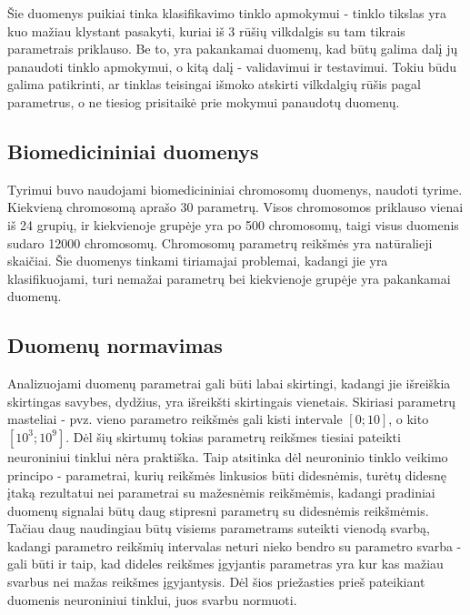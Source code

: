 \documentclass{VUMIFPSbakalaurinis}
\begin{document}
Šie duomenys puikiai tinka klasifikavimo tinklo apmokymui - tinklo tikslas yra kuo mažiau klystant pasakyti, kuriai iš 3 rūšių vilkdalgis su tam tikrais parametrais priklauso.
Be to, yra pakankamai duomenų, kad būtų galima dalį jų panaudoti tinklo apmokymui, o kitą dalį - validavimui ir testavimui.
Tokiu būdu galima patikrinti, ar tinklas teisingai išmoko atskirti vilkdalgių rūšis pagal parametrus, o ne tiesiog prisitaikė prie mokymui panaudotų duomenų.



\subsection{Biomedicininiai duomenys}

Tyrimui buvo naudojami biomedicininiai chromosomų duomenys, naudoti \cite[289~psl.]{price-dimensionality-reduction} tyrime.
Kiekvieną chromosomą aprašo 30 parametrų.
Visos chromosomos priklauso vienai iš 24 grupių, ir kiekvienoje grupėje yra po 500 chromosomų, taigi visus duomenis sudaro 12000 chromosomų.
Chromosomų parametrų reikšmės yra natūralieji skaičiai.
Šie duomenys tinkami tiriamajai problemai, kadangi jie yra klasifikuojami, turi nemažai parametrų bei kiekvienoje grupėje yra pakankamai duomenų.



\subsection{Duomenų normavimas}

Analizuojami duomenų parametrai gali būti labai skirtingi, kadangi jie išreiškia skirtingas savybes, dydžius, yra išreikšti skirtingais vienetais.
Skiriasi parametrų masteliai - pvz. vieno parametro reikšmės gali kisti intervale $[0; 10]$, o kito $[10^3; 10^9]$.
Dėl šių skirtumų tokias parametrų reikšmes tiesiai pateikti neuroniniui tinklui nėra praktiška.
Taip atsitinka dėl neuroninio tinklo veikimo principo - parametrai, kurių reikšmės linkusios būti didesnėmis, turėtų didesnę įtaką rezultatui nei parametrai su mažesnėmis reikšmėmis, kadangi pradiniai duomenų signalai būtų daug stipresni parametrų su didesnėmis reikšmėmis.
Tačiau daug naudingiau būtų visiems parametrams suteikti vienodą svarbą, kadangi parametro reikšmių intervalas neturi nieko bendro su parametro svarba - gali būti ir taip, kad dideles reikšmes įgyjantis parametras yra kur kas mažiau svarbus nei mažas reikšmes įgyjantysis.
Dėl šios priežasties prieš pateikiant duomenis neuroniniui tinklui, juos svarbu normuoti.
\end{document}
